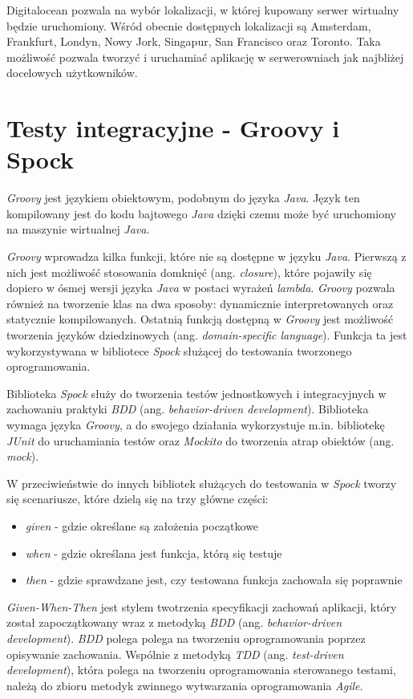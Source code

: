 Digitalocean pozwala na wybór lokalizacji, w której kupowany serwer wirtualny będzie uruchomiony. Wśród obecnie dostępnych lokalizacji są Amsterdam, Frankfurt, Londyn, Nowy Jork, Singapur, San Francisco oraz Toronto. Taka możliwość pozwala tworzyć i uruchamiać aplikację w serwerowniach jak najbliżej docelowych użytkowników. 

\section{Testy integracyjne - Groovy i Spock}

\textsl{Groovy} jest językiem obiektowym, podobnym do języka \textsl{Java}. Język ten kompilowany jest do kodu bajtowego \textsl{Java} dzięki czemu może być uruchomiony na maszynie wirtualnej \textsl{Java}. 

\textsl{Groovy} wprowadza kilka funkcji, które nie są dostępne w języku \textsl{Java}. Pierwszą z nich jest możliwość stosowania domknięć (ang. \textsl{closure}), które pojawiły się dopiero w ósmej wersji języka \textsl{Java} w postaci wyrażeń \textsl{lambda}. \textsl{Groovy} pozwala również na tworzenie klas na dwa sposoby: dynamicznie interpretowanych oraz statycznie kompilowanych. Ostatnią funkcją dostępną w \textsl{Groovy} jest możliwość tworzenia języków dziedzinowych (ang. \textsl{domain-specific language}). Funkcja ta jest wykorzystywana w bibliotece \textsl{Spock} służącej do testowania tworzonego oprogramowania.

Biblioteka \textsl{Spock} służy do tworzenia testów jednostkowych i integracyjnych w zachowaniu praktyki \textsl{BDD} (ang. \textsl{behavior-driven development}). Biblioteka wymaga języka \textsl{Groovy}, a do swojego działania wykorzystuje m.in. bibliotekę \textsl{JUnit} do uruchamiania testów oraz \textsl{Mockito} do tworzenia atrap obiektów (ang. \textsl{mock}). 

W przeciwieństwie do innych bibliotek służących do testowania w \textsl{Spock} tworzy się scenariusze, które dzielą się na trzy główne części: 
\begin{itemize}
    \item \textsl{given} - gdzie określane są założenia początkowe
    \item \textsl{when} - gdzie określana jest funkcja, którą się testuje
    \item \textsl{then} - gdzie sprawdzane jest, czy testowana funkcja zachowała się poprawnie
\end{itemize}

\textsl{Given-When-Then} jest stylem twotrzenia specyfikacji zachowań aplikacji, który został zapoczątkowany wraz z metodyką \textsl{BDD} (ang. \textsl{behavior-driven development}). \textsl{BDD} polega polega na tworzeniu oprogramowania poprzez opisywanie zachowania. Wspólnie z metodyką \textsl{TDD} (ang. \textsl{test-driven development}), która polega na tworzeniu oprogramowania sterowanego testami, należą do zbioru metodyk zwinnego wytwarzania oprogramowania \textsl{Agile}.